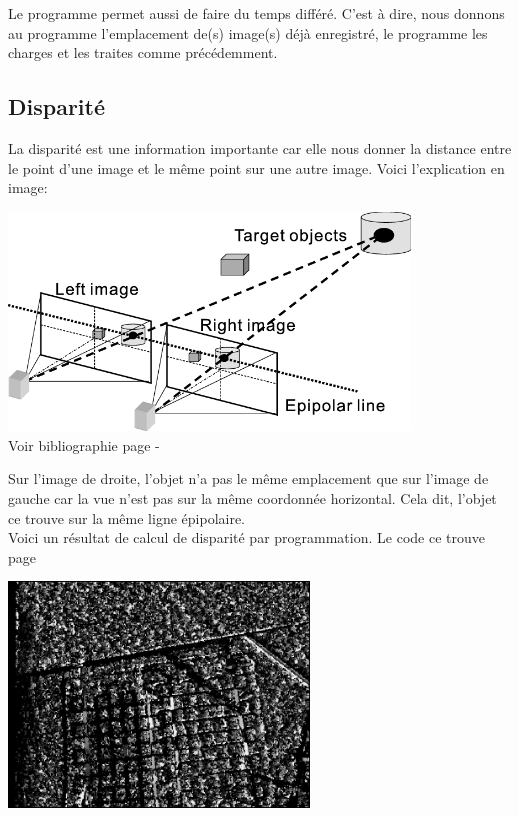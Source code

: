 \documentclass[12pt, french]{report}
\begin{document}
    Le programme permet aussi de faire du temps différé. C'est à dire, nous donnons au programme l'emplacement de(s) image(s) déjà enregistré, le programme les charges et les traites comme précédemment.

\subsection{Disparité}

La disparité est une information importante car elle nous donner la distance entre le point d'une image et le même point sur une autre image. Voici l'explication en image:

\begin{center}
    \includegraphics[width=0.8\textwidth]{Images/Binocular-stereo-vision.png}\\
    Voir bibliographie page  \pageref{biblio} - \cite{article}
\end{center}

Sur l'image de droite, l'objet n'a pas le même emplacement que sur l'image de gauche car la vue n'est pas sur la même coordonnée horizontal. Cela dit, l'objet ce trouve sur la même ligne épipolaire.\\

Voici un résultat de calcul de disparité par programmation. Le code ce trouve page \pageref{disparite}
\begin{center}
    \includegraphics[width=0.6\textwidth]{Images/Code/Disparity.png}
\end{center}
\end{document}
